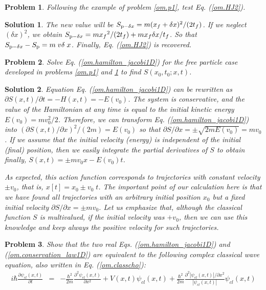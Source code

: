 \documentclass[nofootinbib, secnumarabic, amsmath, nobibnotes,11pt,aps,pra, floatfix]{revtex4-1}
\newtheorem{problem}{Problem}
\newtheorem{solution}{Solution}
\newcommand{\eref}[1]{Eq. (\ref{#1})}
\begin{document}
\begin{problem} \label{om.p2}
Following the example of problem \ref{om.p1}, test \eref{om.HJ2}.
\end{problem}

\begin{solution}
The new value will be $S_{{\rm p} - \delta x} = m (x_f + \delta
x)^2/(2 t_f)$. If we neglect $(\delta x)^2$, we obtain $S_{{\rm
p} - \delta x} = m {x_f}^2/(2 t_f) + m {x_f} \delta x/t_f$. So that
$S_{{\rm p} - \delta x} - S_{\rm p} = m \; v \delta \; x$. Finally,
\eref{om.HJ2} is recovered.
\end{solution}


\begin{problem} \label{om.p3}
Solve \eref{om.hamilton_jacobi1D} for the free particle case developed in problems \ref{om.p1} and \ref{om.p2} to find $S(x_0,t_0;x,t)$.
\end{problem}

\begin{solution}
Equation \eref{om.hamilton_jacobi1D} can be rewritten as ${\partial S(x,t)}/{\partial t} = -H(x,t) = -E(v_0)$. The system is conservative, and the value of the Hamiltonian at any time is equal to the initial kinetic energy $E(v_0) = m v_0^2/2$. Therefore, we can transform \eref{om.hamilton_jacobi1D} into $(\partial S(x,t)/\partial x)^2/(2 m) = E(v_0)$ so that $\partial S/\partial x = \pm \sqrt{2 m E(v_0)} = m v_0$. If we assume that the initial velocity (energy) is independent of the initial (final) position, then we easily integrate the partial derivatives of $S$ to obtain finally, $S(x,t) = \pm m v_0 x - E(v_0) t$.

As expected, this action function corresponds to trajectories with
constant velocity $\pm v_0$, that is, $x[t] = x_0 \pm v_0 \; t$. The
important point of our calculation here is that we have found all
trajectories with an arbitrary initial position $x_0$ but a fixed
initial velocity $\partial S/\partial x = \pm m v_0$. Let us
emphasize that, although the classical function $S$ is multivalued,
if the initial velocity was $ + v_0$, then we can use this knowledge  and keep always the positive velocity for such
trajectories.
\end{solution}

\begin{problem} \label{om.p3bis}
Show that the two real Eqs. (\ref{om.hamilton_jacobi1D}) and (\ref{om.conservation_law1D}) are equivalent to the following complex classical wave equation, also written in \eref{om.classcho}:
\begin{eqnarray}
\label{om.p.classcho}
i \hbar \frac{ \partial \psi_{cl}(x,t)} {\partial t} &=& -\frac {\hbar^2}{2m} \frac{ {\partial}^2 \psi_{cl}(x,t)} {\partial x^2} + V(x,t) \psi_{cl}(x,t)+ \frac {\hbar^{2}} {2 m} \frac { {\partial}^2 |\psi_{cl}(x,t)|/ \partial x^2}{|\psi_{cl}(x,t)|} \psi_{cl}(x,t)\nonumber\\
\end{eqnarray}
\end{problem}
\end{document}
